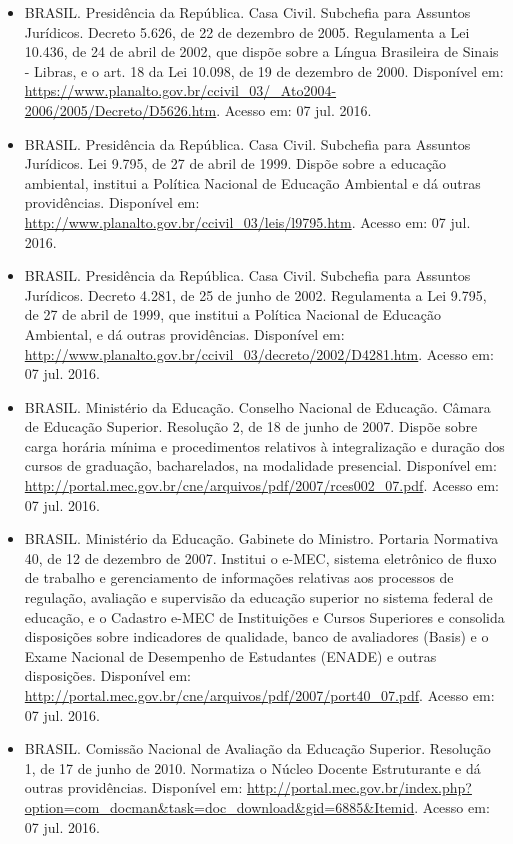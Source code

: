 \begin{itemize}
	\item BRASIL. Presidência da República. Casa Civil. Subchefia para Assuntos Jurídicos. Decreto 5.626, de 22 de dezembro de 2005. Regulamenta a Lei  10.436, de 24 de abril de 2002, que dispõe sobre a Língua Brasileira de Sinais - Libras, e o art. 18 da Lei 10.098, de 19 de dezembro de 2000. Disponível em: \url{https://www.planalto.gov.br/ccivil_03/_Ato2004-2006/2005/Decreto/D5626.htm}. Acesso em: 07 jul. 2016.
	
	\item  BRASIL. Presidência da República. Casa Civil. Subchefia para Assuntos Jurídicos. Lei 9.795, de 27 de abril de 1999. Dispõe sobre a educação ambiental, institui a Política Nacional de Educação Ambiental e dá outras providências. Disponível em: \url{http://www.planalto.gov.br/ccivil_03/leis/l9795.htm}. Acesso em: 07 jul. 2016.
	
	\item BRASIL. Presidência da República. Casa Civil. Subchefia para Assuntos Jurídicos. Decreto 4.281, de 25 de junho de 2002. Regulamenta a Lei 9.795, de 27 de abril de 1999, que institui a Política Nacional de Educação Ambiental, e dá outras providências. Disponível em: \url{http://www.planalto.gov.br/ccivil_03/decreto/2002/D4281.htm}. Acesso em: 07 jul. 2016.
	
	\item BRASIL. Ministério da Educação. Conselho Nacional de Educação. Câmara de Educação Superior. Resolução 2, de 18 de junho de 2007. Dispõe sobre carga horária mínima e procedimentos relativos à integralização e duração dos cursos de graduação, bacharelados, na modalidade presencial. Disponível em: \url{http://portal.mec.gov.br/cne/arquivos/pdf/2007/rces002_07.pdf}. Acesso em: 07 jul. 2016.
	
	\item BRASIL. Ministério da Educação. Gabinete do Ministro. Portaria Normativa 40, de 12 de dezembro de 2007. Institui o e-MEC, sistema eletrônico de fluxo de trabalho e gerenciamento de informações relativas aos processos de regulação, avaliação e supervisão da educação superior no sistema federal de educação, e o Cadastro e-MEC de Instituições e Cursos Superiores e consolida disposições sobre indicadores de qualidade, banco de avaliadores (Basis) e o Exame Nacional de Desempenho de Estudantes (ENADE) e outras disposições. Disponível em: \url{http://portal.mec.gov.br/cne/arquivos/pdf/2007/port40_07.pdf}. Acesso em: 07 jul. 2016.
	
	\item BRASIL. Comissão Nacional de Avaliação da Educação Superior. Resolução 1, de 17 de junho de 2010. Normatiza o Núcleo Docente Estruturante e dá outras providências. Disponível em: \url{http://portal.mec.gov.br/index.php?option=com_docman&task=doc_download&gid=6885&Itemid}. Acesso em: 07 jul. 2016.
	

\end{itemize}
